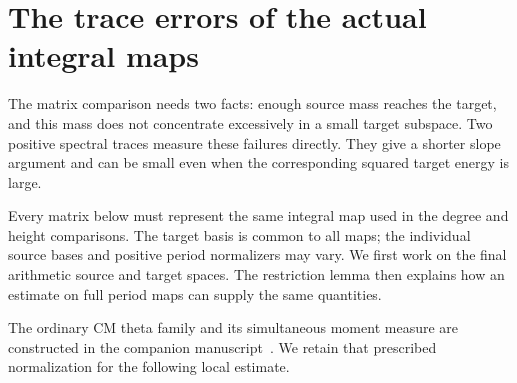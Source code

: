 \section{The trace errors of the actual integral maps}
\label{rh-energy}

The matrix comparison needs two facts: enough source mass reaches the
target, and this mass does not concentrate excessively in a small target
subspace. Two positive spectral traces measure these failures directly.
They give a shorter slope argument and can be small even when the
corresponding squared target energy is large.

Every matrix below must represent the same integral map used in the
degree and height comparisons. The target basis is common to all maps;
the individual source bases and positive period normalizers may vary.
We first work on the final arithmetic source and target spaces. The
restriction lemma then explains how an estimate on full period maps can
supply the same quantities.







The ordinary CM theta family and its simultaneous moment measure are
constructed in the companion manuscript~\cite{rh-companion}.
We retain that prescribed normalization for the following local estimate.
















